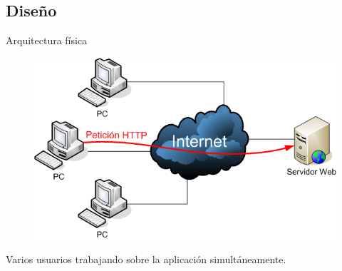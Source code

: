 \documentclass[spanish,xcolor=table,svgnames]{beamer}
\begin{document}
\subsection*{Diseño}
\begin{frame}{Arquitectura física}
  \begin{figure}[]
\includegraphics[scale=0.35]{arquitectura}
\end{figure}
  \begin{block}{}
Varios usuarios trabajando sobre la aplicación simultáneamente.
  \end{block}
\end{frame}
\end{document}
